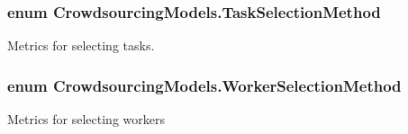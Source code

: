 \subsubsection[{Task\+Selection\+Method}]{\setlength{\rightskip}{0pt plus 5cm}enum {\bf Crowdsourcing\+Models.\+Task\+Selection\+Method}\hspace{0.3cm}{\ttfamily [strong]}}\label{namespace_crowdsourcing_models_a1bb21d66b6c86daa36af97d919528356}


Metrics for selecting tasks. 

\hypertarget{namespace_crowdsourcing_models_a1f0e849dc0691caa8fda0ce7778756a6}{}
\subsubsection[{Worker\+Selection\+Method}]{\setlength{\rightskip}{0pt plus 5cm}enum {\bf Crowdsourcing\+Models.\+Worker\+Selection\+Method}\hspace{0.3cm}{\ttfamily [strong]}}\label{namespace_crowdsourcing_models_a1f0e849dc0691caa8fda0ce7778756a6}


Metrics for selecting workers 

